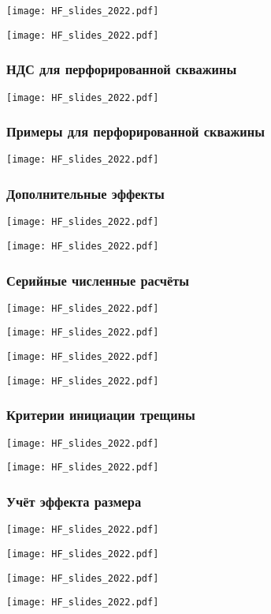 \documentclass[main.tex]{subfiles}
\begin{document}
\texttt{[image: HF\_slides\_2022.pdf]}

\texttt{[image: HF\_slides\_2022.pdf]}

\subsubsection{НДС для перфорированной скважины}

\texttt{[image: HF\_slides\_2022.pdf]}

\subsubsection{Примеры для перфорированной скважины}

\texttt{[image: HF\_slides\_2022.pdf]}

\subsubsection{Дополнительные эффекты}

\texttt{[image: HF\_slides\_2022.pdf]}

\texttt{[image: HF\_slides\_2022.pdf]}

\subsubsection{Серийные численные расчёты}

\texttt{[image: HF\_slides\_2022.pdf]}

\texttt{[image: HF\_slides\_2022.pdf]}

\texttt{[image: HF\_slides\_2022.pdf]}

\texttt{[image: HF\_slides\_2022.pdf]}

\subsubsection{Критерии инициации трещины}

\texttt{[image: HF\_slides\_2022.pdf]}

\texttt{[image: HF\_slides\_2022.pdf]}

\subsubsection{Учёт эффекта размера}

\texttt{[image: HF\_slides\_2022.pdf]}

\texttt{[image: HF\_slides\_2022.pdf]}

\texttt{[image: HF\_slides\_2022.pdf]}

\texttt{[image: HF\_slides\_2022.pdf]}
\end{document}
